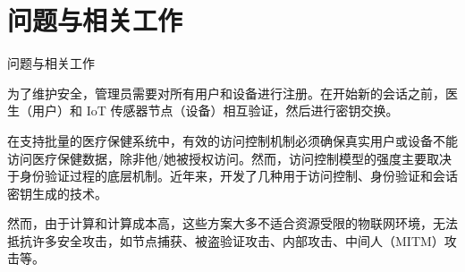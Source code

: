 \documentclass{beamer}
\begin{document}


\section{问题与相关工作}
\begin{frame}{问题与相关工作}
    \footnotesize  %
    
    为了维护安全，管理员需要对所有用户和设备进行注册。在开始新的会话之前，医生（用户）和 IoT 传感器节点（设备）相互验证，然后进行密钥交换。

    \vspace{0.2cm}
    
    在支持批量的医疗保健系统中，有效的访问控制机制必须确保真实用户或设备不能访问医疗保健数据，除非他/她被授权访问。然而，访问控制模型的强度主要取决于身份验证过程的底层机制。近年来，开发了几种用于访问控制、身份验证和会话密钥生成的技术。

    \vspace{0.2cm}
    
    然而，由于计算和计算成本高，这些方案大多不适合资源受限的物联网环境，无法抵抗许多安全攻击，如节点捕获、被盗验证攻击、内部攻击、中间人（MITM）攻击等。
    
\end{frame}
\end{document}

